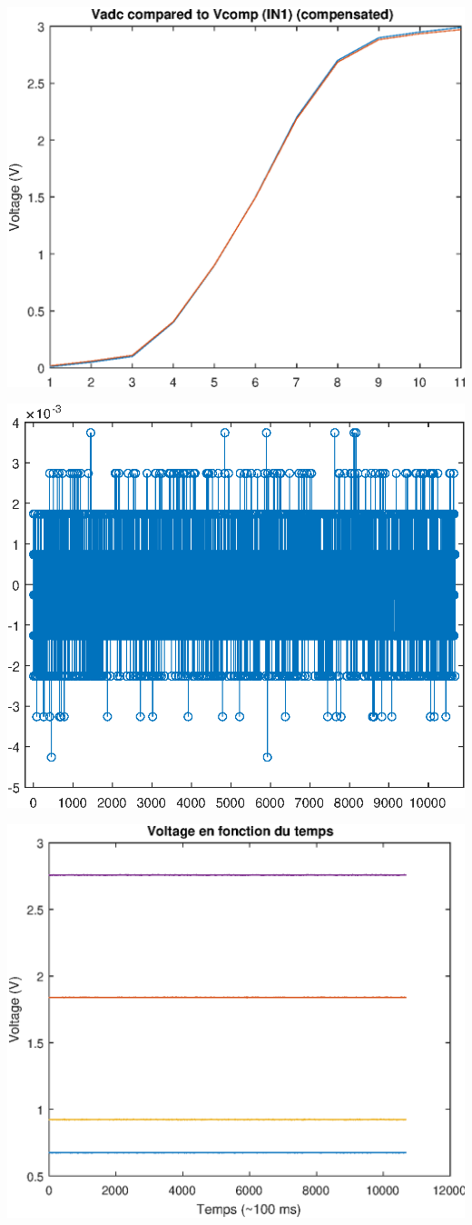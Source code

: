 \includegraphics[width=\SchematicWidth]{images/ADC/gain-compensated.eps}

\includegraphics[width=\SchematicWidth]{images/ADC/stdev-adc.eps}

\includegraphics[width=\SchematicWidth]{images/ADC/time-deviation.eps}

